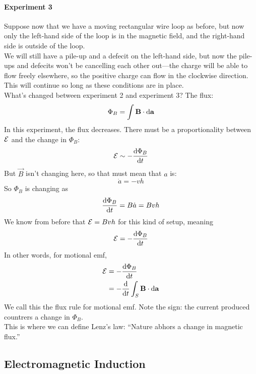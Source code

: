 \documentclass[a4paper]{article}
\begin{document}
\paragraph{Experiment 3}
Suppose now that we have a moving rectangular wire loop as before, but now only
the left-hand side of the loop is in the magnetic field, and the right-hand
side is outside of the loop.\\
We will still have a pile-up and a defecit on the left-hand side, but now the
pile-ups and defecits won't be cancelling each other out---the charge will be
able to flow freely elsewhere, so the positive charge can flow in the
clockwise direction. This will continue so long as these conditions are in
place.\\
What's changed between experiment 2 and experiment 3? The flux:
\[ \Phi_B = \int \boldsymbol{\mathbf{B}} \cdot \mathrm{d}\boldsymbol{\mathbf{a}} \]
In this experiment, the flux decreases. There must be a proportionality between
$\mathcal{E}$ and the change in $\Phi_B$:
\[ \mathcal{E} \sim -\frac{\mathrm{d} \Phi_B}{\mathrm{d} t} \]
But $\vec{B}$ isn't changing here, so that must mean that $a$ is:
\[ \dot{a} = -vh \]
So $\Phi_B$ is changing as
\[ \frac{\mathrm{d} \Phi_B}{\mathrm{d} t} = B\dot{a} = Bvh \]
We know from before that $\mathcal{E} = Bvh$ for this kind of setup, meaning
\[ \mathcal{E} = -\frac{\mathrm{d} \Phi_B}{\mathrm{d} t} \]
In other words, for motional emf,
\begin{align*}
	\mathcal{E} &= -\frac{\mathrm{d} \Phi_B}{\mathrm{d} t}\\
	   &= -\frac{\mathrm{d} }{\mathrm{d} t}\int_S\boldsymbol{\mathbf{B}}\cdot\mathrm{d}\boldsymbol{\mathbf{a}}
\end{align*}
We call this the flux rule for motional emf. Note the sign: the current
produced countrers a change in $\Phi_B$.\\
This is where we can define Lenz's law: ``Nature abhors a change in magnetic
flux.''

\subsection{Electromagnetic Induction}
\end{document}

